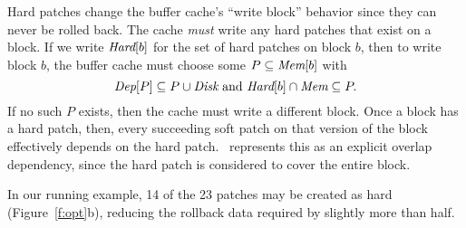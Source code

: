 Hard patches change the buffer cache's ``write block'' behavior since they
can never be rolled back.
%
The cache \emph{must} write any hard patches that exist on a block.
%
If we write $\PHard[b]$ for the set of hard patches on block $b$, then to
write block $b$, the buffer cache must choose some $P \subseteq \PMem[b]$
with
%
\[ \PDepset{P} \subseteq P \cup \PDisk \text{ and } \PHard[b] \cap \PMem
\subseteq P. \]
%
If no such $P$ exists, then the cache must write a different block.
%
Once a block has a hard patch, then, every succeeding soft patch on that
version of the block effectively depends on the hard patch.
%
\Kudos\ represents this as an explicit overlap dependency, since the hard
patch is considered to cover the entire block.


In our running example, 14 of the 23 patches may be created as hard
(Figure~\ref{f:opt}b),
%
reducing the rollback data required by slightly more than half.


